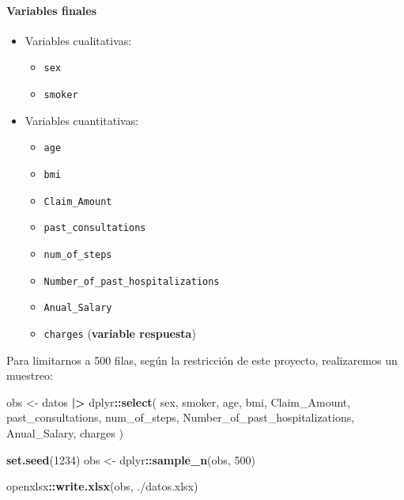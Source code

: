 \documentclass[
]{article}
\newenvironment{Shaded}{\begin{snugshade}}{\end{snugshade}}
\newcommand{\DecValTok}[1]{\textcolor[rgb]{0.00,0.00,0.81}{#1}}
\newcommand{\FunctionTok}[1]{\textcolor[rgb]{0.13,0.29,0.53}{\textbf{#1}}}
\newcommand{\NormalTok}[1]{#1}
\newcommand{\OtherTok}[1]{\textcolor[rgb]{0.56,0.35,0.01}{#1}}
\newcommand{\SpecialCharTok}[1]{\textcolor[rgb]{0.81,0.36,0.00}{\textbf{#1}}}
\newcommand{\StringTok}[1]{\textcolor[rgb]{0.31,0.60,0.02}{#1}}
\providecommand{\tightlist}{%
  \setlength{\itemsep}{0pt}\setlength{\parskip}{0pt}}
\begin{document}
\paragraph{Variables finales}\label{variables-finales}

\begin{itemize}
\tightlist
\item
  Variables cualitativas:

  \begin{itemize}
  \tightlist
  \item
    \texttt{sex}
  \item
    \texttt{smoker}
  \end{itemize}
\item
  Variables cuantitativas:

  \begin{itemize}
  \tightlist
  \item
    \texttt{age}
  \item
    \texttt{bmi}
  \item
    \texttt{Claim\_Amount}
  \item
    \texttt{past\_consultations}
  \item
    \texttt{num\_of\_steps}
  \item
    \texttt{Number\_of\_past\_hospitalizations}
  \item
    \texttt{Anual\_Salary}
  \item
    \texttt{charges} (\textbf{variable respuesta})
  \end{itemize}
\end{itemize}

Para limitarnos a 500 filas, según la restricción de este proyecto,
realizaremos un muestreo:

\begin{Shaded}
\begin{Highlighting}[]
\NormalTok{obs }\OtherTok{\textless{}{-}}\NormalTok{ datos }\SpecialCharTok{|\textgreater{}}
\NormalTok{  dplyr}\SpecialCharTok{::}\FunctionTok{select}\NormalTok{(}
\NormalTok{    sex,}
\NormalTok{    smoker,}
\NormalTok{    age,}
\NormalTok{    bmi,}
\NormalTok{    Claim\_Amount,}
\NormalTok{    past\_consultations,}
\NormalTok{    num\_of\_steps,}
\NormalTok{    Number\_of\_past\_hospitalizations,}
\NormalTok{    Anual\_Salary,}
\NormalTok{    charges}
\NormalTok{  )}

\FunctionTok{set.seed}\NormalTok{(}\DecValTok{1234}\NormalTok{)}
\NormalTok{obs }\OtherTok{\textless{}{-}}\NormalTok{ dplyr}\SpecialCharTok{::}\FunctionTok{sample\_n}\NormalTok{(obs, }\DecValTok{500}\NormalTok{)}

\NormalTok{openxlsx}\SpecialCharTok{::}\FunctionTok{write.xlsx}\NormalTok{(obs, }\StringTok{\textquotesingle{}./datos.xlsx\textquotesingle{}}\NormalTok{)}
\end{Highlighting}
\end{Shaded}
\end{document}

